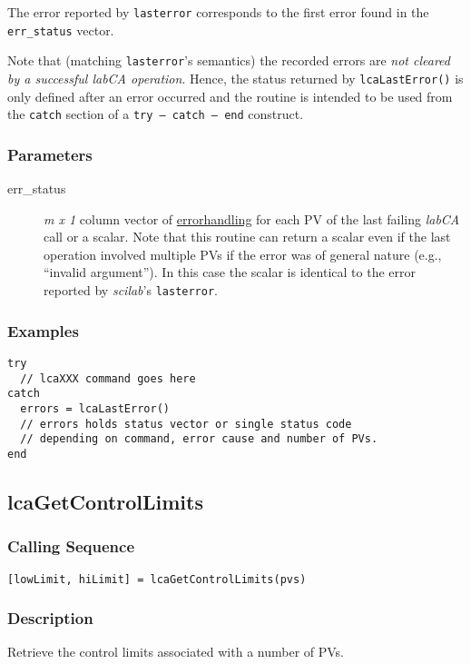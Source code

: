 \documentclass{article}
\newcommand{\sca}{\ita{labCA}}
\newcommand{\scilab}{\ita{scilab}}
\newcommand{\com}[1]{{\tt #1}}
\newcommand{\pbrkf}{\pagebreak}
\newcommand{\ita}[1]{\emph{#1}}
\newcommand{\mxl}{$m\times 1$}
\renewcommand{\mxl}{\ita{m x 1}}
\renewcommand{\pbrkf}{}
\begin{document}
The error reported by \com{lasterror} corresponds to the first error
found in the \com{err\_status} vector.

Note that (matching \com{lasterror}'s semantics) the recorded
errors are {\it not cleared by a successful \sca{} operation}.
Hence, the status returned by \com{lcaLastError()} is only defined
after an error occurred and the routine is intended to be used
from the \com{catch} section of a \mbox{\com{try -- catch -- end}}
construct.

\subsubsection{Parameters}
\begin{description}
\item[err\_status] \mxl{} column vector of
\hyperref{status codes}{(see~}{)}{errorhandling}
for each PV of the last failing \sca{} call or a scalar.
Note that this routine can return a scalar even if
the last operation involved multiple PVs if the
error was of general nature (e.g., ``invalid argument'').
In this case the scalar is identical to the error reported
by \scilab{}'s \com{lasterror}.
\end{description}
\subsubsection{Examples}
\begin{verbatim}
try
  // lcaXXX command goes here
catch
  errors = lcaLastError()
  // errors holds status vector or single status code
  // depending on command, error cause and number of PVs.
end
\end{verbatim}

\vspace*{\fill}
\pbrkf
\subsection{lcaGetControlLimits}
\subsubsection{Calling Sequence}
\begin{verbatim}
[lowLimit, hiLimit] = lcaGetControlLimits(pvs)
\end{verbatim}
\subsubsection{Description}
Retrieve the control limits associated with a number of PVs.
\end{document}
